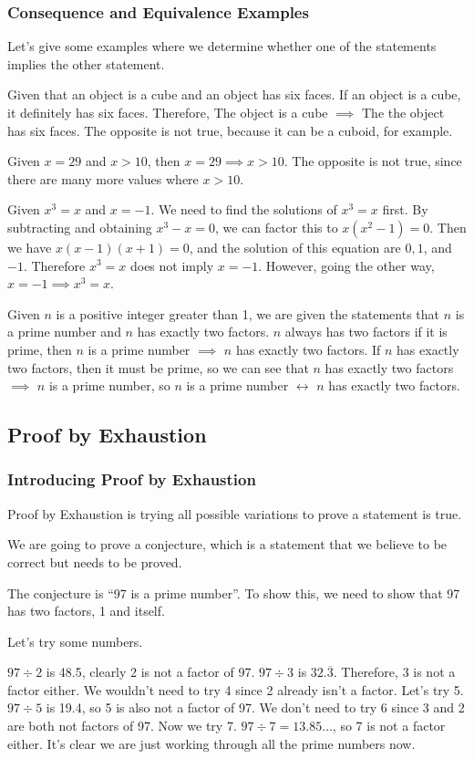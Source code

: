 \documentclass[../maths.tex]{subfiles}
\begin{document}
\subsubsection*{Consequence and Equivalence Examples}
Let's give some examples where we determine whether one of the statements implies the other statement.

Given that an object is a cube and an object has six faces. If an object is a cube, it definitely has six faces. Therefore, 
The object is a cube $\implies$ The the object has six faces. The opposite is not true, because it can be a cuboid, for example.

Given $x=29$ and $x>10$, then $x=29 \implies x>10$. The opposite is not true, since there are many more values where $x>10$.

Given $x^3=x$ and $x=-1$. We need to find the solutions of $x^3=x$ first. By subtracting and obtaining $x^3-x=0$, we can factor this to $x(x^2-1)=0$. Then we have $x(x-1)(x+1)=0$, and the solution of this equation are $0,1$, and $-1$.
Therefore $x^3=x$ does not imply $x=-1$. However, going the other way, $x=-1 \implies x^3=x$.

Given $n$ is a positive integer greater than 1, we are given the statements that $n$ is a prime number and $n$ has exactly two factors.
$n$ always has two factors if it is prime, then $n$ is a prime number $\implies$ $n$ has exactly two factors. If $n$ has exactly two factors, then it must be prime, so we can see that 
$n$ has exactly two factors $\implies$ $n$ is a prime number, so $n$ is a prime number $\leftrightarrow$ $n$ has exactly two factors.
\subsection*{Proof by Exhaustion}
\subsubsection*{Introducing Proof by Exhaustion}
Proof by Exhaustion is trying all possible variations to prove a statement is true.

We are going to prove a conjecture, which is a statement that we believe to be correct but needs to be proved.

The conjecture is ``97 is a prime number''. To show this, we need to show that 97 has two factors, 1 and itself.

Let's try some numbers. 

$97\div 2$ is 48.5, clearly 2 is not a factor of 97. $97\div 3$ is $32.\overline{3}$. Therefore, 3 is not a factor either.
We wouldn't need to try 4 since 2 already isn't a factor. Let's try 5. $97\div 5$ is 19.4, so 5 is also not a factor of 97. We don't need to try 6 since 3 and 2 are both not factors of 97.
Now we try 7. $97\div 7=13.85\dots$, so 7 is not a factor either. It's clear we are just working through all the prime numbers now.
\end{document}
